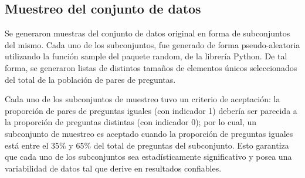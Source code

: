 \subsection{Muestreo del conjunto de datos}

Se generaron muestras del conjunto de datos original en forma de subconjuntos del mismo. Cada uno de los subconjuntos, fue generado de forma pseudo-aleatoria utilizando la función sample del paquete random, de la librería Python. De tal forma, se generaron listas de distintos tamaños de elementos únicos seleccionados del total de la población de pares de preguntas.

\bigskip Cada uno de los subconjuntos de muestreo tuvo un criterio de aceptación: la proporción de pares de preguntas iguales (con indicador 1) debería ser parecida a la proporción de preguntas distintas (con indicador 0); por lo cual, un subconjunto de muestreo es aceptado cuando la proporción de preguntas iguales está entre el \(35\%\) y \(65\%\) del total de preguntas del subconjunto. Esto garantiza que cada uno de los subconjuntos sea estadísticamente significativo y posea una variabilidad de datos tal que derive en resultados confiables.
